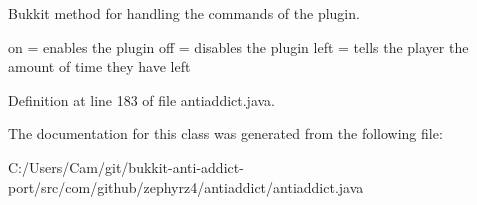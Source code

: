 \-Bukkit method for handling the commands of the plugin. 

on = enables the plugin off = disables the plugin left = tells the player the amount of time they have left 

\-Definition at line 183 of file antiaddict.\-java.



\-The documentation for this class was generated from the following file\-:\begin{DoxyCompactItemize}
\item 
\-C\-:/\-Users/\-Cam/git/bukkit-\/anti-\/addict-\/port/src/com/github/zephyrz4/antiaddict/antiaddict.\-java\end{DoxyCompactItemize}
